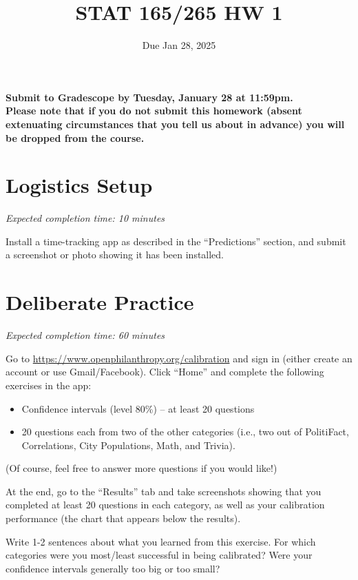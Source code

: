 \documentclass[11pt]{article}
\title{STAT 165/265 HW 1}
\date{Due Jan 28, 2025}
\begin{document}
\maketitle

\hfill \textbf{Submit to Gradescope by Tuesday, January 28 at 11:59pm.\\Please note that if you do not submit this homework (absent extenuating circumstances that you tell us about in advance) you will be dropped from the course.}

\section*{Logistics Setup}

\emph{Expected completion time: 10 minutes}

Install a time-tracking app as described in the ``Predictions'' section, and submit a screenshot or photo showing it has been 
installed.

\section*{Deliberate Practice}

\emph{Expected completion time: 60 minutes}

Go to \url{https://www.openphilanthropy.org/calibration} and sign in (either create an account or use 
Gmail/Facebook). Click ``Home'' and complete the following exercises in the app:

\begin{itemize}

\item Confidence intervals (level 80\%) -- at least 20 questions
\item 20 questions each from two of the other categories (i.e., two out of PolitiFact, Correlations, City Populations, Math, and Trivia).

\end{itemize}

(Of course, feel free to answer more questions if you would like!)

At the end, go to the ``Results'' tab and take screenshots showing that 
you completed at least 20 questions in each category, as well as your calibration 
performance (the chart that appears below the results).

Write 1-2 sentences about what you learned from this exercise. For which categories were you most/least successful in being calibrated? Were your confidence intervals generally too big or too small?
\end{document}
